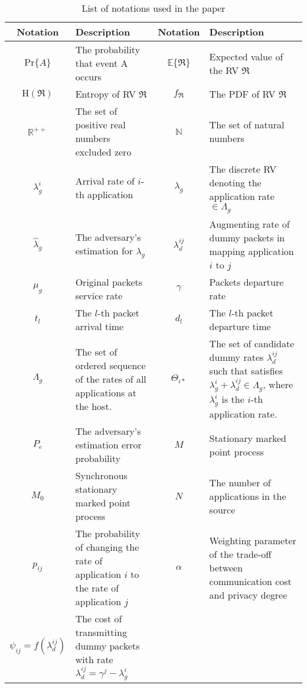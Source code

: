 \documentclass[journal,10pt]{IEEEtran}
\begin{document}
\begin{table*}
	\centering
\renewcommand{\arraystretch}{1.5}
\caption{List of notations used in the paper}
\begin{tabular}{cp{7.2cm}cp{7.2cm}}
\toprule
Notation & Description & Notation & Description\\
\midrule
$\mathrm{Pr}\{A\}$ & The probability that event A occurs & $\mathbb{E}\{\Re\}$ & Expected value of the RV $\Re$  \\
$\mathrm{H}(\Re)$ & Entropy of  RV $\Re$& $f_{\Re}$ & The PDF of RV $\Re$\\
$\mathbb{R}^{++}$ & The set of positive real numbers  excluded zero&$\mathbb{N}$ & The set of natural numbers\\
\midrule
$\lambda_{g}^{i}$  & Arrival rate  of $i$-th application & $\lambda_{g}$ & The discrete RV denoting the application rate $\in\Lambda_g$\\
 $\hat{\lambda}_{g}$ & The adversary's estimation for $\lambda_{g}$ & $\lambda_{d}^{ij}$ & Augmenting rate of  dummy packets  in mapping application $i$ to $j$ \\
$\mu_{g}$ & Original packets service rate  &
$\gamma$ & Packets departure rate  \\
$t_{l}$ & The $l$-th packet  arrival time &
$d_{l}$ & The $l$-th packet  departure time \\
\midrule
$\Lambda_{g}$ & The set of ordered sequence of the rates of all applications at the host. &
$\Theta_{i*}$ &  The set of candidate dummy rates $\lambda_{d}^{ij}$ such that satisfies $\lambda_{g}^{i}+\lambda_{d}^{ij} \in \Lambda_{g}$, where $\lambda_{g}^{i}$ is the $i$-th application rate. \\
$P_{e}$ & The adversary's estimation error probability &$M$& Stationary marked point process\\
$M_0$ & Synchronous stationary marked point process &  $N$ & The number of  applications in the source\\
 $p_{ij}$ &  The probability of changing the rate of application $i$ to the rate of application $j$ & $\alpha$ &  Weighting parameter of the trade-off between communication cost and privacy degree  \\
 $\psi_{ij}= f(\lambda_{d}^{ij})$ & The cost of transmitting dummy packets with rate $\lambda_{d}^{ij}=\gamma^{j}-\lambda_{g}^{i}$ & & \\
\bottomrule 
\end{tabular}
\label{tab:symbols}
\end{table*}
\end{document}
